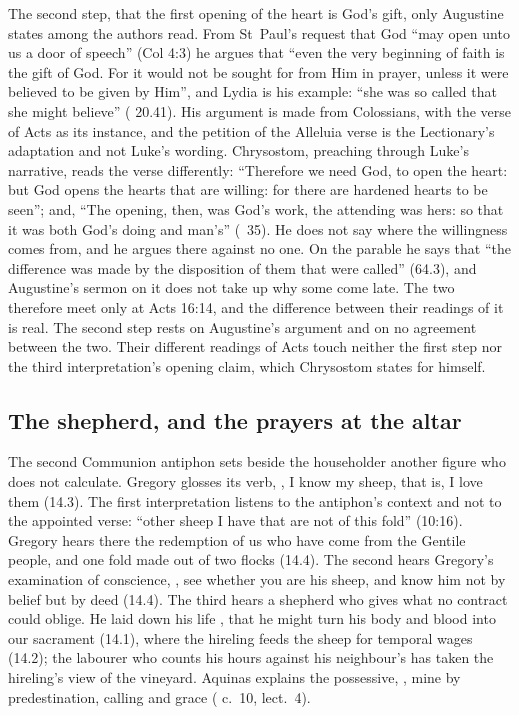 The second step, that the first opening of the heart is God's gift, only
Augustine states among the authors read. From St~Paul's request that God ``may
open unto us a door of speech'' (Col 4:3) he argues that ``even the very
beginning of faith is the gift of God. For it would not be sought for from Him
in prayer, unless it were believed to be given by Him'', and Lydia is his
example: ``she was so called that she might believe'' ( 20.41). His argument is made from Colossians, with
the verse of Acts as its instance, and the petition of the Alleluia verse is
the Lectionary's adaptation and not Luke's wording. Chrysostom, preaching
through Luke's narrative, reads the verse differently: ``Therefore we need God, to open the heart: but God opens the
hearts that are willing: for there are hardened hearts to be seen''; and,
``The opening, then, was God's work, the attending was hers: so that it was
both God's doing and man's'' (~35). He does not say
where the willingness comes from, and he argues there against no one. On the
parable he says that ``the difference was made by the disposition of them that
were called'' (64.3), and Augustine's sermon on it does not take up why some
come late. The two therefore meet only at Acts 16:14, and the difference between
their readings of it is real. The second step rests on Augustine's argument and on no
agreement between the two. Their different readings of Acts touch neither
the first step nor the third interpretation's opening claim, which
Chrysostom states for himself.

\subsection{The shepherd, and the prayers at the altar}

The second Communion antiphon sets beside the householder another figure who
does not calculate. Gregory glosses its verb, , I know my sheep, that is, I love them (14.3). The first interpretation listens to
the antiphon's context and not to the appointed verse: ``other sheep I have
that are not of this fold'' (10:16). Gregory hears there the redemption of us
who have come from the Gentile people, and one fold made out of two flocks
(14.4). The
second hears Gregory's examination of
conscience, , see whether you are his sheep,
and know him not by belief but by deed (14.4). The third hears a shepherd who gives what no contract could
oblige. He laid down his life , that he might turn his body and blood into our sacrament
(14.1), where the hireling feeds the sheep for temporal wages (14.2); the labourer who counts his hours against his
neighbour's has taken the hireling's view of the vineyard. Aquinas explains
the possessive, ,
mine by predestination, calling and grace ( c.~10,
lect.~4).

